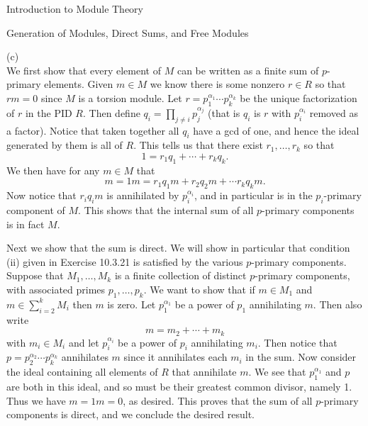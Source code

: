 \begin{chapter}{Introduction to Module Theory}
\begin{section}{Generation of Modules, Direct Sums, and Free Modules}
\begin{solution}
(c)\\
We first show that every element of $M$ can be written as a finite sum of $p$-primary elements. Given $m\in M$ we know there is some nonzero $r\in R$ so that $rm = 0$ since $M$ is a torsion module. Let $r=p_1^{\alpha_1}\cdots p_k^{\alpha_k}$ be the unique factorization of $r$ in the PID $R$. Then define $q_i =\prod_{j\neq i} p_j^{\alpha_j}$ (that is $q_i$ is $r$ with $p_i^{\alpha_i}$ removed as a factor). Notice that taken together all $q_i$ have a gcd of one, and hence the ideal generated by them is all of $R$. This tells us that there exist $r_1,\ldots, r_k$ so that \[
1 = r_1q_1+\cdots + r_kq_k.
\]
We then have for any $m\in M$ that \[
m = 1m = r_1q_1m + r_2q_2m + \cdots r_kq_km.
\]
Now notice that $r_iq_im$ is annihilated by $p_i^{\alpha_i}$, and in particular is in the $p_i$-primary component of $M$. This shows that the internal sum of all $p$-primary components is in fact $M$. 

Next we show that the sum is direct. We will show in particular that condition (ii) given in Exercise 10.3.21 is satisfied by the various $p$-primary components. Suppose that $M_1,\ldots, M_k$ is a finite collection of distinct $p$-primary components, with associated primes $p_1,\ldots, p_k$. We want to show that if $m\in M_1$ and $m\in \sum_{i=2}^k M_i$ then $m$ is zero. Let $p_1^{\alpha_1}$ be a power of $p_1$ annihilating $m$. Then also write \[
m = m_2+\cdots +m_k
\]
with $m_i\in M_i$ and let $p_i^{\alpha_i}$ be a power of $p_i$ annihilating $m_i$. Then notice that $p = p_2^{\alpha_2}\cdots p_k^{\alpha_k}$ annihilates $m$ since it annihilates each $m_i$ in the sum. Now consider the ideal containing all elements of $R$ that annihilate $m$. We see that $p_1^{\alpha_1}$ and $p$ are both in this ideal, and so must be their greatest common divisor, namely 1. Thus we have $m = 1m = 0$, as desired. This proves that the sum of all $p$-primary components is direct, and we conclude the desired result.

\end{solution}\oneperpage




\end{section}
\end{chapter}
